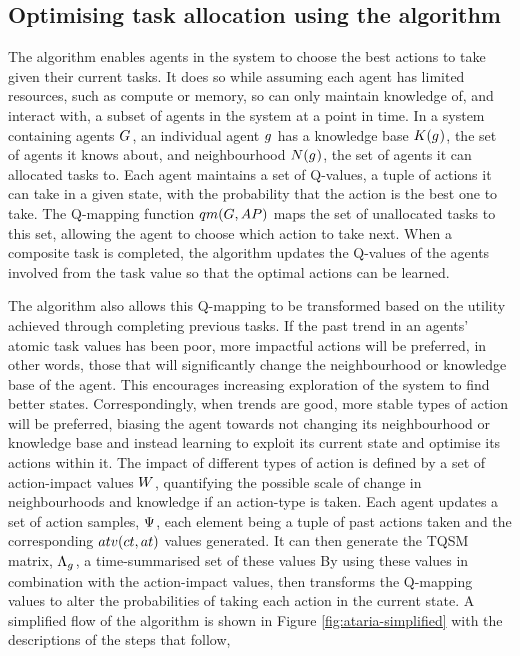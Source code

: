 \subsection{Optimising task allocation using the \acronymATARIA{}{} algorithm}
\label{section:solution_ataria}

The \acronymATARIA{}{} algorithm enables agents in the system to choose the best actions to take given their current tasks. It does so while assuming each agent has limited resources, such as compute or memory, so can only maintain knowledge of,  and interact with,  a subset of agents in the system at a point in time. In a system containing agents $G_{}^{}$, an individual agent $g_{}^{}$ has a knowledge base $\functionKnowledgeSignature{}{}$, the set of agents it knows about, and neighbourhood $\functionNeighbourhoodSignature{}{}$, the set of agents it can allocated tasks to. Each agent maintains a set of Q-values, a tuple of actions it can take in a given state, with the probability that the action is the best one to take. The  Q-mapping function $\functionQMappingSignature{}{}$ maps the set of unallocated tasks to this set, allowing the agent to choose which action to take next. When a composite task is completed, the algorithm updates the Q-values of the agents involved from the task value so that the optimal actions can be learned.

The \acronymATARIA{}{} algorithm also allows this Q-mapping to be transformed based on the utility achieved through completing previous tasks. If the past trend in an agents'  atomic task values has been poor, more impactful actions will be preferred, in other words, those that will significantly change the neighbourhood or knowledge base of the agent. This encourages increasing exploration of the system to find better states. Correspondingly, when trends are good, more stable types of action will be preferred, biasing the agent towards not changing its neighbourhood or knowledge base and instead learning to exploit its current state and optimise its actions within it. The impact of different types of action is defined by a set of action-impact values $\setRiskAction{}{}$, quantifying  the possible scale of change in neighbourhoods and knowledge if an action-type is taken. Each agent updates a set of action samples, $\setActionSample{}{}$, each element being a tuple of past actions taken and the corresponding $\functionTaskAbsoluteValue{}{}$ values generated. It can then generate the TQSM matrix, $\setRewardSet{\varAgent{}{}}{}$, a time-summarised set of these values By using these values in combination with the action-impact values, \acronymATARIA{}{} then transforms the Q-mapping values to alter the probabilities of taking each action in the current state. A simplified flow of the \acronymATARIA{}{} algorithm is shown in Figure \ref{fig:ataria-simplified} with the descriptions of the steps that follow,

